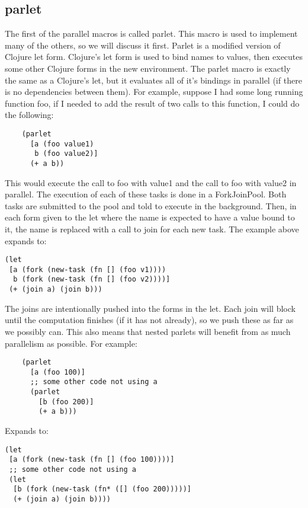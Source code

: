 \documentclass{article}
\begin{document}
\subsection{parlet}
The first of the parallel macros is called parlet.
This macro is used to implement many of the others, so we will discuss it first.
Parlet is a modified version of Clojure let form.
Clojure's let form is used to bind names to values, then executes some other
Clojure forms in the new environment.
The parlet macro is exactly the same as a Clojure's let, but it evaluates all of
it's bindings in parallel (if there is no dependencies between them).
For example, suppose I had some long running function foo, if I needed to add
the result of two calls to this function, I could do the following:

\begin{verbatim}
    (parlet
      [a (foo value1)
       b (foo value2)]
      (+ a b))
\end{verbatim}

This would execute the call to foo with value1 and the call to foo with value2
in parallel. The execution of each of these tasks is done in a ForkJoinPool.
Both tasks are submitted to the pool and told to execute in the background.
Then, in each form given to the let where the name is expected to have a value
bound to it, the name is replaced with a call to join for each new task. The
example above expands to:

\begin{verbatim}
(let
 [a (fork (new-task (fn [] (foo v1))))
  b (fork (new-task (fn [] (foo v2))))]
 (+ (join a) (join b)))
\end{verbatim}

The joins are intentionally pushed into the forms in the let. Each join will
block until the computation finishes (if it has not already), so we push these
as far as we possibly can. This also means that nested parlets will benefit from
as much parallelism as possible. For example:

\begin{verbatim}
    (parlet
      [a (foo 100)]
      ;; some other code not using a
      (parlet
        [b (foo 200)]
        (+ a b)))
\end{verbatim}

Expands to:

\begin{verbatim}
(let
 [a (fork (new-task (fn [] (foo 100))))]
 ;; some other code not using a
 (let
  [b (fork (new-task (fn* ([] (foo 200)))))]
  (+ (join a) (join b))))
\end{verbatim}
\end{document}
